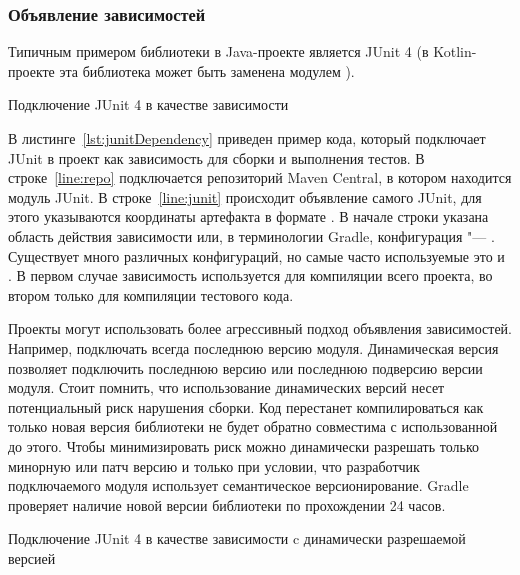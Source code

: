 \subsubsection*{Объявление зависимостей}

Типичным примером библиотеки в Java-проекте является JUnit 4 (в Kotlin-проекте эта библиотека может быть заменена модулем ).

\begin{listing}[H]
  \caption{Подключение JUnit 4 в качестве зависимости}
  \label{lst:junitDependency}
\end{listing}

В листинге~\ref{lst:junitDependency} приведен пример кода, который подключает JUnit в проект как зависимость для сборки и выполнения тестов.
В строке~\ref{line:repo} подключается репозиторий Maven Central, в котором находится модуль JUnit.
В строке~\ref{line:junit} происходит объявление самого JUnit, для этого указываются координаты артефакта в формате .
В начале строки указана область действия зависимости или, в терминологии Gradle, конфигурация "--- .
Существует много различных конфигураций, но самые часто используемые это  и .
В первом случае зависимость используется для компиляции всего проекта, во втором только для компиляции тестового кода.

Проекты могут использовать более агрессивный подход объявления зависимостей.
Например, подключать всегда последнюю версию модуля.
Динамическая версия позволяет подключить последнюю версию или последнюю подверсию версии модуля.
Стоит помнить, что использование динамических версий несет потенциальный риск нарушения сборки.
Код перестанет компилироваться как только новая версия библиотеки не будет обратно совместима с использованной до этого.
Чтобы минимизировать риск можно динамически разрешать только минорную или патч версию и только при условии, что разработчик подключаемого модуля использует семантическое версионирование.
Gradle проверяет наличие новой версии библиотеки по прохождении 24 часов.

\begin{listing}[H]
  \caption{Подключение JUnit 4 в качестве зависимости c динамически разрешаемой версией}
  \label{lst:junitDependencyDynamic}
\end{listing}


